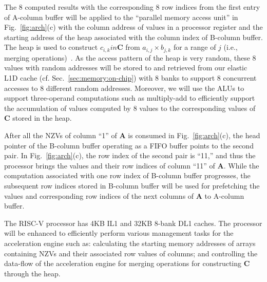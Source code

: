 

The 8 computed results with the corresponding 8 row indices from the first entry of A-column buffer will be applied to 
the ``parallel memory access unit'' in Fig.~\ref{fig:arch}(c) with the column address of values in a processor register and the starting address of the heap associated with the column index of B-column buffer.
The heap is used to construct $c_{i,k} in $\textbf{C} from $a_{i,j} \times b_{j,k}$ for a range of $j$ (i.e., merging operations)~\cite{buluc:ipdps:2015}. 
As the access pattern of the heap is very random, these 8 values with random addresses will be stored to and retrieved from our elastic L1D cache (cf. Sec.~\ref{sec:memory:on-chip}) with 8 banks to support 8 concurrent accesses to 8 different random addresses.
Moreover, we will use the ALUs to support three-operand computations such as multiply-add to efficiently support the accumulation of values computed by 8 values to the corresponding values of \textbf{C} stored in the heap.


After all the NZVs of column ``1'' of \textbf{A} is consumed in Fig.~\ref{fig:arch}(c), 
the head pointer of the B-column buffer operating as a FIFO buffer points to the second pair.
In Fig.~\ref{fig:arch}(c), the row index of the second pair is ``11,'' 
and thus the processor brings the values and their row indices of column ``11'' of \textbf{A}. 
While the computation associated with one row index of B-column buffer progresses, 
the subsequent row indices stored in B-column buffer will be used for prefetching the values and corresponding row indices of the next columns of \textbf{A} to A-column buffer.


The RISC-V processor has 4KB IL1 and 32KB 8-bank DL1 caches.
The processor will be enhanced to efficiently perform various management tasks for the acceleration engine such as:
calculating the starting memory addresses of arrays containing NZVs and their associated row values of columns; and
controlling the data-flow of the acceleration engine for merging operations for constructing \textbf{C} through the heap.
 

